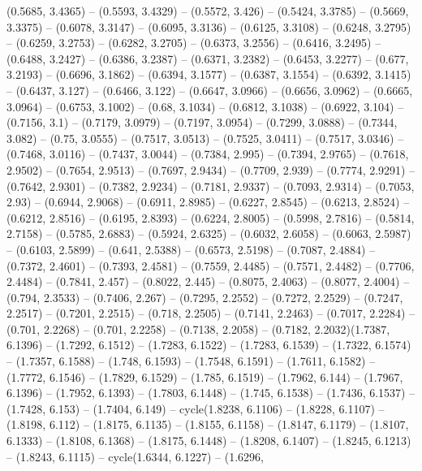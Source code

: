 {   (0.5685, 3.4365) -- (0.5593, 3.4329) -- (0.5572, 3.426) -- (0.5424, 3.3785) 
  -- (0.5669, 3.3375) -- (0.6078, 3.3147) -- (0.6095, 3.3136) -- (0.6125, 
  3.3108) -- (0.6248, 3.2795) -- (0.6259, 3.2753) -- (0.6282, 3.2705) -- 
  (0.6373, 3.2556) -- (0.6416, 3.2495) -- (0.6488, 3.2427) -- (0.6386, 3.2387) 
  -- (0.6371, 3.2382) -- (0.6453, 3.2277) -- (0.677, 3.2193) -- (0.6696, 3.1862)
   -- (0.6394, 3.1577) -- (0.6387, 3.1554) -- (0.6392, 3.1415) -- (0.6437, 
  3.127) -- (0.6466, 3.122) -- (0.6647, 3.0966) -- (0.6656, 3.0962) -- (0.6665, 
  3.0964) -- (0.6753, 3.1002) -- (0.68, 3.1034) -- (0.6812, 3.1038) -- (0.6922, 
  3.104) -- (0.7156, 3.1) -- (0.7179, 3.0979) -- (0.7197, 3.0954) -- (0.7299, 
  3.0888) -- (0.7344, 3.082) -- (0.75, 3.0555) -- (0.7517, 3.0513) -- (0.7525, 
  3.0411) -- (0.7517, 3.0346) -- (0.7468, 3.0116) -- (0.7437, 3.0044) -- 
  (0.7384, 2.995) -- (0.7394, 2.9765) -- (0.7618, 2.9502) -- (0.7654, 2.9513) --
   (0.7697, 2.9434) -- (0.7709, 2.939) -- (0.7774, 2.9291) -- (0.7642, 2.9301) 
  -- (0.7382, 2.9234) -- (0.7181, 2.9337) -- (0.7093, 2.9314) -- (0.7053, 2.93) 
  -- (0.6944, 2.9068) -- (0.6911, 2.8985) -- (0.6227, 2.8545) -- (0.6213, 
  2.8524) -- (0.6212, 2.8516) -- (0.6195, 2.8393) -- (0.6224, 2.8005) -- 
  (0.5998, 2.7816) -- (0.5814, 2.7158) -- (0.5785, 2.6883) -- (0.5924, 2.6325) 
  -- (0.6032, 2.6058) -- (0.6063, 2.5987) -- (0.6103, 2.5899) -- (0.641, 2.5388)
   -- (0.6573, 2.5198) -- (0.7087, 2.4884) -- (0.7372, 2.4601) -- (0.7393, 
  2.4581) -- (0.7559, 2.4485) -- (0.7571, 2.4482) -- (0.7706, 2.4484) -- 
  (0.7841, 2.457) -- (0.8022, 2.445) -- (0.8075, 2.4063) -- (0.8077, 2.4004) -- 
  (0.794, 2.3533) -- (0.7406, 2.267) -- (0.7295, 2.2552) -- (0.7272, 2.2529) -- 
  (0.7247, 2.2517) -- (0.7201, 2.2515) -- (0.718, 2.2505) -- (0.7141, 2.2463) --
   (0.7017, 2.2284) -- (0.701, 2.2268) -- (0.701, 2.2258) -- (0.7138, 2.2058) --
   (0.7182, 2.2032)(1.7387, 6.1396) -- (1.7292, 6.1512) -- (1.7283, 6.1522) -- 
  (1.7283, 6.1539) -- (1.7322, 6.1574) -- (1.7357, 6.1588) -- (1.748, 6.1593) --
   (1.7548, 6.1591) -- (1.7611, 6.1582) -- (1.7772, 6.1546) -- (1.7829, 6.1529) 
  -- (1.785, 6.1519) -- (1.7962, 6.144) -- (1.7967, 6.1396) -- (1.7952, 6.1393) 
  -- (1.7803, 6.1448) -- (1.745, 6.1538) -- (1.7436, 6.1537) -- (1.7428, 6.153) 
  -- (1.7404, 6.149) -- cycle(1.8238, 6.1106) -- (1.8228, 6.1107) -- (1.8198, 
  6.112) -- (1.8175, 6.1135) -- (1.8155, 6.1158) -- (1.8147, 6.1179) -- (1.8107,
   6.1333) -- (1.8108, 6.1368) -- (1.8175, 6.1448) -- (1.8208, 6.1407) -- 
  (1.8245, 6.1213) -- (1.8243, 6.1115) -- cycle(1.6344, 6.1227) -- (1.6296, 
}
